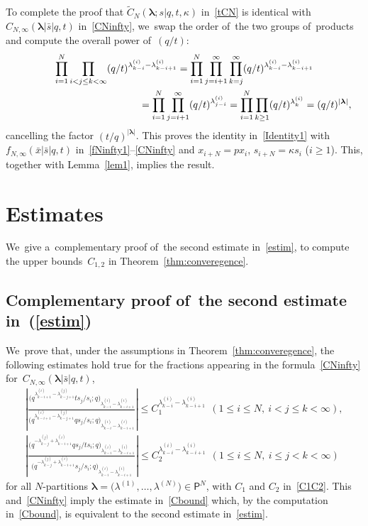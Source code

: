 \documentclass[pdftex]{sigma}%
\numberwithin{equation}{section}
\newcommand{\vlam}{\boldsymbol{\lambda}}
\newcommand{\bx}{\bar{x}}
\newcommand{\bs}{\bar{s}}
\begin{document}
To complete the proof that $ \tilde C_N(\vlam;s|q,t,\kappa)$ in~\eqref{tCN} is identical with $C_{N,\infty}(\vlam|\bs|q,t)$ in~\eqref{CNinfty}, we~swap the order of~the two groups of~products and compute the overall power of~$(q/t)$:
\begin{gather*}
\prod_{i=1}^N \prod_{i<j\leq k<\infty} (q/t)^{\lambda^{(i)}_{k-i}-\lambda^{(i)}_{k-i+1}} = \prod_{i=1}^N\prod_{j=i+1}^\infty\prod_{k=j}^\infty (q/t)^{\lambda^{(i)}_{k-i}-\lambda^{(i)}_{k-i+1}}
\\ \hphantom{\prod_{i=1}^N \prod_{i<j\leq k<\infty} (q/t)^{\lambda^{(i)}_{k-i}-\lambda^{(i)}_{k-i+1}}}
{}= \prod_{i=1}^N \prod_{j=i+1}^\infty (q/t)^{\lambda^{(i)}_{j-i}} = \prod_{i=1}^N\prod_{k\geq 1} (q/t)^{\lambda^{(i)}_{k}} =(q/t)^{|\vlam|},
\end{gather*}
cancelling the factor $(t/q)^{|\vlam|}$.
This proves the identity in~\eqref{Identity1} with $f_{N,\infty}(\bx|\bs|q,t)$ in~\eqref{fNinfty1}--\eqref{CNinfty} and $x_{i+N}=px_i$, $s_{i+N}=\kappa s_i$ ($i\geq 1$).
This, together with Lemma~\ref{lem1}, implies the result.

\section{Estimates}\label{app:estim}
{\sloppy
We~give a~complementary proof of~the second estimate in~\eqref{estim}, to compute the upper bounds~$C_{1,2}$ in Theorem~\ref{thm:converegence}.

}

\subsection[Complementary proof of~the second estimate in (3.13)]{Complementary proof of~the second estimate in~(\ref{estim})}
\label{app:proofestim}
We~prove that, under the assumptions in Theorem~\ref{thm:converegence}, the following estimates hold true for the fractions appearing in the formula~\eqref{CNinfty} for~$C_{N,\infty}(\vlam|\bs|q,t)$,
\begin{gather}
\label{frac1}
\left|\frac{\big(q^{\lambda^{(i)}_{k-i+1} - \lambda^{(j)}_{k-j+1}}ts_{j}/s_i;q\big)_{\lambda^{(i)}_{k-i}-\lambda^{(i)}_{k-i+1}}}{\big(q^{\lambda^{(i)}_{k-i+1} - \lambda^{(j)}_{k-j+1}}qs_{j}/s_i;q\big)_{\lambda^{(i)}_{k-i}-\lambda^{(i)}_{k-i+1}}}\right|\leq C_1^{\lambda^{(i)}_{k-i}-\lambda^{(i)}_{k-i+1}} \ \ (1\leq i\leq N,\ i<j\leq k<\infty) ,\!\!\!
\\
\label{frac2}
\left| \frac{\big(q^{-\lambda^{(j)}_{k-j}+\lambda^{(i)}_{k-i+1}}qs_{j}/ts_i ;q\big)_{\lambda^{(i)}_{k-i}-\lambda^{(i)}_{k-i+1}}}{\big(q^{-\lambda^{(j)}_{k-j}+\lambda^{(i)}_{k-i+1}}s_{j}/s_i ;q\big)_{\lambda^{(i)}_{k-i}-\lambda^{(i)}_{k-i+1}}} \right| \leq C_2^{\lambda^{(i)}_{k-i}-\lambda^{(i)}_{k-i+1}} \ \
(1\leq i\leq N,\ i\leq j< k<\infty)\!\!
\end{gather}
for all $N$-partitions $\vlam=\big(\lambda^{(1)},\dots,\lambda^{(N)}\big)\in\mathsf{P}^N$, with $C_1$ and $C_2$ in~\eqref{C1C2}.
This and~\eqref{CNinfty} imply the estimate in~\eqref{Cbound} which, by the computation in~\eqref{Cbound}, is equivalent to the second estimate in~\eqref{estim}.
\end{document}
